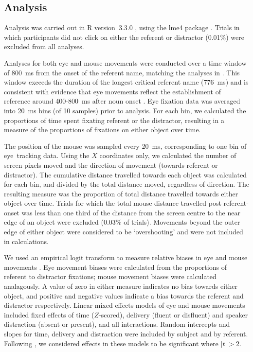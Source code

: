 \documentclass[a4paper,man,natbib]{apa6}
\begin{document}

\subsection{Analysis}
Analysis was carried out in R version~3.3.0 \citep{rbase}, using the lme4 package \citep{lme4}. 
Trials in which participants did not click on either the referent or distractor (0.01\%) were excluded from all analyses. 

Analyses for both eye and mouse movements were conducted over a time window of 800~ms from the onset of the referent name, matching the analyses in \citet{Loy2016}.
This window exceeds the duration of the longest critical referent name (776~ms) and is consistent with evidence that eye movements reflect the establishment of reference around 400-800~ms after noun onset \citep{Eberhard1995}.
Eye fixation data was averaged into 20~ms bins (of 10 samples) prior to analysis.
For each bin, we calculated the proportions of time spent fixating referent or the distractor, resulting in a measure of the proportions of fixations on either object over time.

The position of the mouse was sampled every 20~ms, corresponding to one bin of eye~tracking data.
Using the $X$ coordinates only, we calculated the number of screen pixels moved and the direction of movement (towards referent or distractor).
The cumulative distance travelled towards each object was calculated for each bin, and divided by the total distance moved, regardless of direction.
The resulting measure was the proportion of total distance travelled towards either object over time.
Trials for which the total mouse distance travelled post referent-onset was less than one third of the distance from the screen centre to the near edge of an object were excluded (0.03\% of trials). 
Movements beyond the outer edge of either object were considered to be `overshooting' and were not included in calculations.

We used an empirical logit transform to measure relative biases in eye and mouse movements \citep{Barr2008}.
Eye movement biases were calculated from the proportions of referent to distractor fixations;
mouse movement biases were calculated analagously.
A value of zero in either measure indicates no bias towards either object, and positive and negative values indicate a bias towards the referent and distractor respectively.
Linear mixed effects models of eye and mouse movements included fixed effects of time ($Z$-scored), delivery (fluent or disfluent) and speaker distraction (absent or present), and all interactions.
Random intercepts and slopes for time, delivery and distraction were included by subject and by referent.
Following \citet{baayen2008analyzing}, we considered effects in these models to be significant where $|t|>2$.
\end{document}
